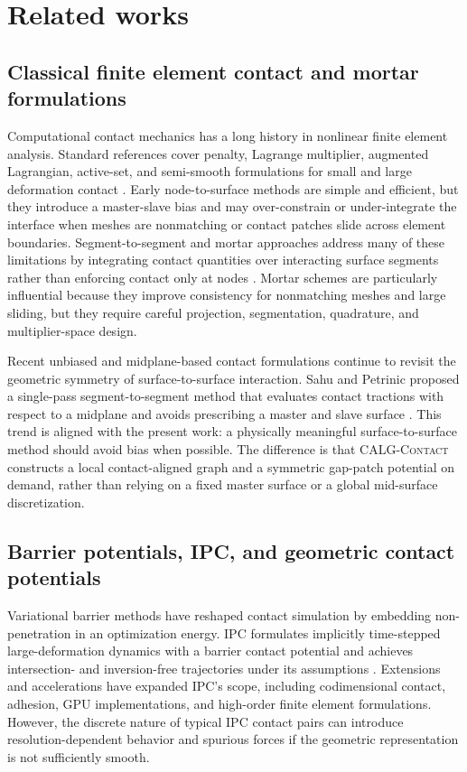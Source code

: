 \documentclass[preprint,12pt]{elsarticle}
\newcommand{\method}{\textsc{CALG-Contact}}
\begin{document}
\section{Related works}
\label{sec:related}

\subsection{Classical finite element contact and mortar formulations}

Computational contact mechanics has a long history in nonlinear finite element analysis. Standard references cover penalty, Lagrange multiplier, augmented Lagrangian, active-set, and semi-smooth formulations for small and large deformation contact \cite{laursen2002,wriggers2006}. Early node-to-surface methods are simple and efficient, but they introduce a master-slave bias and may over-constrain or under-integrate the interface when meshes are nonmatching or contact patches slide across element boundaries. Segment-to-segment and mortar approaches address many of these limitations by integrating contact quantities over interacting surface segments rather than enforcing contact only at nodes \cite{puso2004mortar,puso2004friction}. Mortar schemes are particularly influential because they improve consistency for nonmatching meshes and large sliding, but they require careful projection, segmentation, quadrature, and multiplier-space design.

Recent unbiased and midplane-based contact formulations continue to revisit the geometric symmetry of surface-to-surface interaction. Sahu and Petrinic proposed a single-pass segment-to-segment method that evaluates contact tractions with respect to a midplane and avoids prescribing a master and slave surface \cite{sahu2025midplane}. This trend is aligned with the present work: a physically meaningful surface-to-surface method should avoid bias when possible. The difference is that \method{} constructs a local contact-aligned graph and a symmetric gap-patch potential on demand, rather than relying on a fixed master surface or a global mid-surface discretization.

\subsection{Barrier potentials, IPC, and geometric contact potentials}

Variational barrier methods have reshaped contact simulation by embedding non-penetration in an optimization energy. IPC formulates implicitly time-stepped large-deformation dynamics with a barrier contact potential and achieves intersection- and inversion-free trajectories under its assumptions \cite{li2020ipc}. Extensions and accelerations have expanded IPC's scope, including codimensional contact, adhesion, GPU implementations, and high-order finite element formulations. However, the discrete nature of typical IPC contact pairs can introduce resolution-dependent behavior and spurious forces if the geometric representation is not sufficiently smooth.
\end{document}
